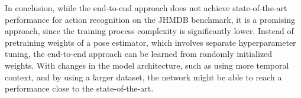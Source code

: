 In conclusion, while the end-to-end approach does not achieve state-of-the-art performance for action recognition on the JHMDB benchmark, it is a promising approach, since the training process complexity is significantly lower.
Instead of pretraining weights of a pose estimator, which involves separate hyperparameter tuning, the end-to-end approach can be learned from randomly initialized weights.
With changes in the model architecture, such as using more temporal context, and by using a larger dataset, the network might be able to reach a performance close to the state-of-the-art. 